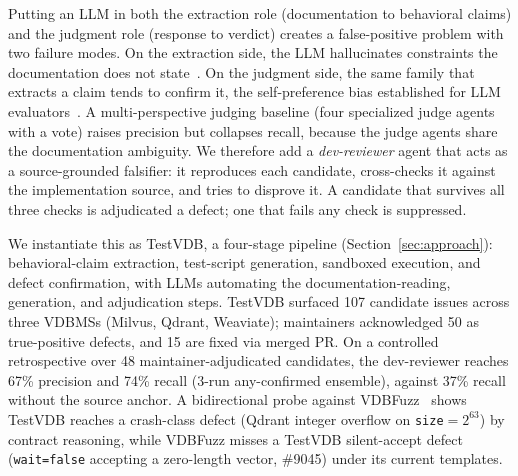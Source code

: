 \documentclass[sigconf]{acmart}
\begin{document}
Putting an LLM in both the extraction role (documentation to behavioral claims) and the judgment role (response to verdict) creates a false-positive problem with two failure modes. On the extraction side, the LLM hallucinates constraints the documentation does not state~\cite{ji23hall}. On the judgment side, the same family that extracts a claim tends to confirm it, the self-preference bias established for LLM evaluators~\cite{panickssery24}. A multi-perspective judging baseline (four specialized judge agents with a vote) raises precision but collapses recall, because the judge agents share the documentation ambiguity. We therefore add a \emph{dev-reviewer} agent that acts as a source-grounded falsifier: it reproduces each candidate, cross-checks it against the implementation source, and tries to disprove it. A candidate that survives all three checks is adjudicated a defect; one that fails any check is suppressed.

We instantiate this as TestVDB, a four-stage pipeline (Section~\ref{sec:approach}): behavioral-claim extraction, test-script generation, sandboxed execution, and defect confirmation, with LLMs automating the documentation-reading, generation, and adjudication steps. TestVDB surfaced 107 candidate issues across three VDBMSs (Milvus, Qdrant, Weaviate); maintainers acknowledged 50 as true-positive defects, and 15 are fixed via merged PR. On a controlled retrospective over 48 maintainer-adjudicated candidates, the dev-reviewer reaches 67\% precision and 74\% recall (3-run any-confirmed ensemble), against 37\% recall without the source anchor. A bidirectional probe against VDBFuzz~\cite{vdbfuzz26} shows TestVDB reaches a crash-class defect (Qdrant integer overflow on \texttt{size}$=2^{63}$) by contract reasoning, while VDBFuzz misses a TestVDB silent-accept defect (\texttt{wait=false} accepting a zero-length vector, \#9045) under its current templates.
\end{document}
